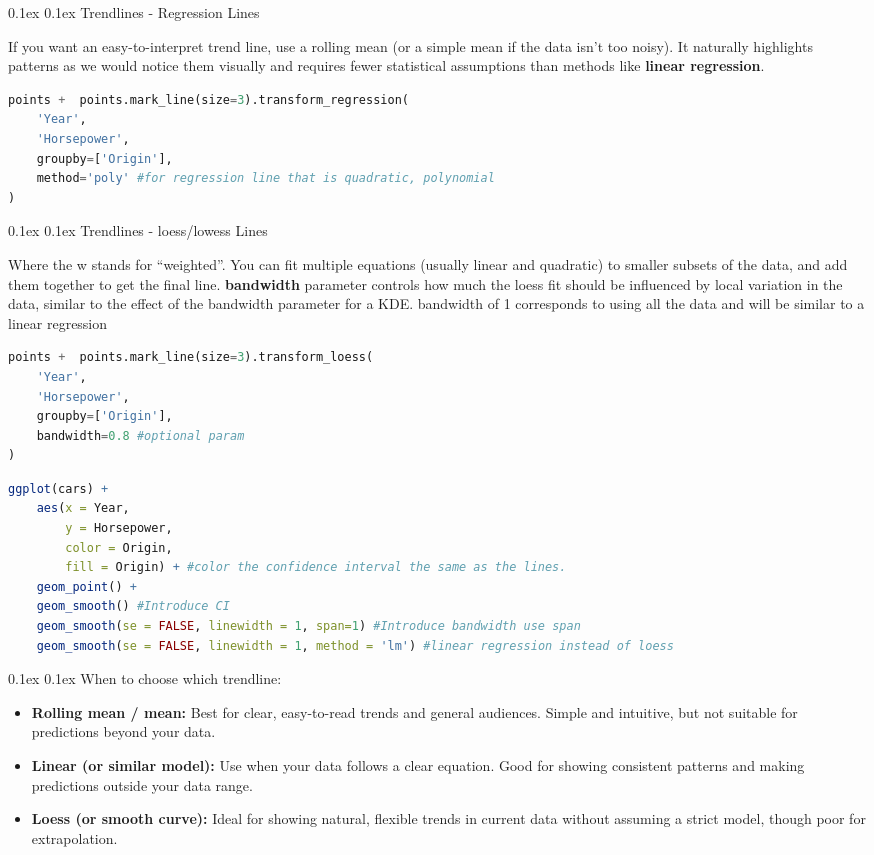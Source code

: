 \documentclass[8pt,landscape]{article}
\makeatletter
\renewcommand{\subsection}{\@startsection{subsection}{2}{0pt}%
    {0.1ex}%
    {0.1ex}%
    {\fontsize{8}{9}\bfseries\color{blue}}} %
\newcommand{\smalltext}[1]{%
  {\fontsize{8}{9}\selectfont\sloppy #1\par}%
}
\makeatother
\begin{document}
\begin{multicols}{3}
\subsection{Trendlines - Regression Lines}
\smalltext{
If you want an easy-to-interpret trend line, use a rolling mean 
(or a simple mean if the data isn’t too noisy). It naturally 
highlights patterns as we would notice them visually and requires fewer 
statistical assumptions than methods like \textbf{linear regression}. 
}
\begin{lstlisting}[language=Python]
points +  points.mark_line(size=3).transform_regression(
    'Year',
    'Horsepower',
    groupby=['Origin'],
    method='poly' #for regression line that is quadratic, polynomial
)
\end{lstlisting}

\subsection{Trendlines - loess/lowess Lines}
\smalltext{
Where the w stands for “weighted”. You can fit multiple equations (usually linear and quadratic) to smaller subsets of the data, and add them together to get the final line. 
\textbf{bandwidth} parameter controls how much the loess fit should be influenced by local variation in the data, similar to the effect of the bandwidth parameter for a KDE.
bandwidth of 1 corresponds to using all the data and will be similar to a linear regression
}
\begin{lstlisting}[language=Python]
points +  points.mark_line(size=3).transform_loess(
    'Year',
    'Horsepower',
    groupby=['Origin'],
    bandwidth=0.8 #optional param
)
\end{lstlisting}
\begin{lstlisting}[language=R]
ggplot(cars) + 
    aes(x = Year,
        y = Horsepower,
        color = Origin,
        fill = Origin) + #color the confidence interval the same as the lines.
    geom_point() +
    geom_smooth() #Introduce CI
    geom_smooth(se = FALSE, linewidth = 1, span=1) #Introduce bandwidth use span
    geom_smooth(se = FALSE, linewidth = 1, method = 'lm') #linear regression instead of loess
\end{lstlisting}
\subsection{When to choose which trendline:}
\begin{itemize}
    \item \textbf{Rolling mean / mean:} Best for clear, easy-to-read trends and general audiences. Simple and intuitive, but not suitable for predictions beyond your data.
    \item \textbf{Linear (or similar model):} Use when your data follows a clear equation. Good for showing consistent patterns and making predictions outside your data range.
    \item \textbf{Loess (or smooth curve):} Ideal for showing natural, flexible trends in current data without assuming a strict model, though poor for extrapolation.
\end{itemize}


\end{multicols}
\end{document}
